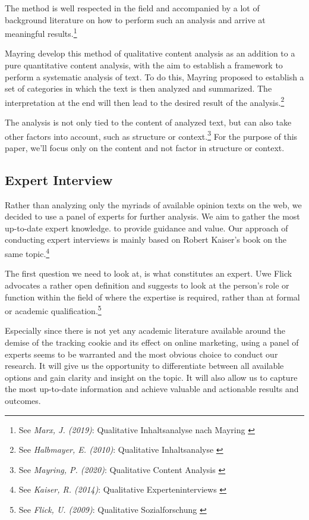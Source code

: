 The method is well respected in the field and accompanied by a lot of background literature on how to perform such an analysis and arrive at meaningful results.\footnote{See \textit{Marx, J. (2019)}: Qualitative Inhaltsanalyse nach Mayring \cite{qualiInhalt}}

Mayring develop this method of qualitative content analysis as an addition to a pure quantitative content analysis, with the aim to establish a framework to perform a systematic analysis of text. To do this, Mayring proposed to establish a set of categories in which the text is then analyzed and summarized. The interpretation at the end will then lead to the desired result of the analysis.\footnote{See \textit{Halbmayer, E. (2010)}: Qualitative Inhaltsanalyse \cite{qualiVienna}}

The analysis is not only tied to the content of analyzed text, but can also take other factors into account, such as structure or context.\footnote{See \textit{Mayring, P. (2020)}: Qualitative Content Analysis \cite{qualiContent}} For the purpose of this paper, we'll focus only on the content and not factor in structure or context.

\subsection{Expert Interview}

Rather than analyzing only the myriads of available opinion texts on the web, we decided to use a panel of experts for further analysis. We aim to gather the most up-to-date expert knowledge. to provide guidance and value. Our approach of conducting expert interviews is mainly based on Robert Kaiser's book on the same topic.\footnote{See \textit{Kaiser, R. (2014)}: Qualitative Experteninterviews \cite{expertInterviews}}

The first question we need to look at, is what constitutes an expert. Uwe Flick advocates a rather open definition and suggests to look at the person's role or function within the field of where the expertise is required, rather than at formal or academic qualification.\footnote{See \textit{Flick, U. (2009)}: Qualitative Sozialforschung \cite{expertDefinition}}

Especially since there is not yet any academic literature available around the demise of the tracking cookie and its effect on online marketing, using a panel of experts seems to be warranted and the most obvious choice to conduct our research. It will give us the opportunity to differentiate between all available options and gain clarity and insight on the topic. It will also allow us to capture the most up-to-date information and achieve valuable and actionable results and outcomes.

